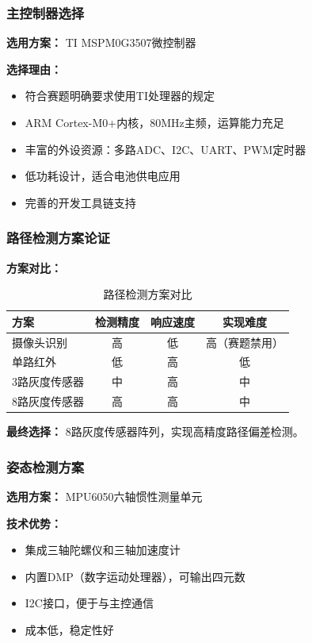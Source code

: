\documentclass[UTF8]{ctexart}
\begin{document}
\subsubsection{主控制器选择}

\textbf{选用方案：} TI MSPM0G3507微控制器

\textbf{选择理由：}
\begin{itemize}
    \item 符合赛题明确要求使用TI处理器的规定
    \item ARM Cortex-M0+内核，80MHz主频，运算能力充足
    \item 丰富的外设资源：多路ADC、I2C、UART、PWM定时器
    \item 低功耗设计，适合电池供电应用
    \item 完善的开发工具链支持
\end{itemize}

\subsubsection{路径检测方案论证}

\textbf{方案对比：}

\begin{table}[H]
    \centering
    \caption{路径检测方案对比}
    \label{tab:path_detection}
    \begin{tabular}{lccc}
        \toprule
        方案 & 检测精度 & 响应速度 & 实现难度 \\
        \midrule
        摄像头识别 & 高 & 低 & 高（赛题禁用） \\
        单路红外 & 低 & 高 & 低 \\
        3路灰度传感器 & 中 & 高 & 中 \\
        8路灰度传感器 & 高 & 高 & 中 \\
        \bottomrule
    \end{tabular}
\end{table}

\textbf{最终选择：} 8路灰度传感器阵列，实现高精度路径偏差检测。

\subsubsection{姿态检测方案}

\textbf{选用方案：} MPU6050六轴惯性测量单元

\textbf{技术优势：}
\begin{itemize}
    \item 集成三轴陀螺仪和三轴加速度计
    \item 内置DMP（数字运动处理器），可输出四元数
    \item I2C接口，便于与主控通信
    \item 成本低，稳定性好
\end{itemize}
\end{document}
